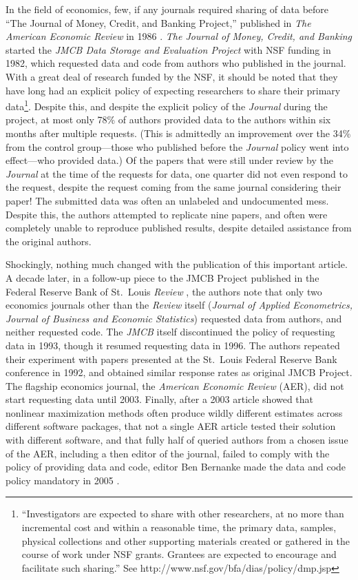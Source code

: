 \documentclass[12pt] {article}
\begin{document}
In the field of economics, few, if any journals required sharing of data
before ``The Journal of Money, Credit, and Banking Project,'' published
in \emph{The American Economic Review} in 1986 \citep{dewald_replication_1986}. \emph{The Journal of Money, Credit, and Banking} started
the \emph{JMCB Data Storage and Evaluation Project} with NSF funding in
1982, which requested data and code from authors who published in the
journal. With a great deal of research funded by the NSF, it should be
noted that they have long had an explicit policy of expecting
researchers to share their primary data\footnote{``Investigators are
  expected to share with other researchers, at no more than incremental
  cost and within a reasonable time, the primary data, samples, physical
  collections and other supporting materials created or gathered in the
  course of work under NSF grants. Grantees are expected to encourage
  and facilitate such sharing.'' See
  http://www.nsf.gov/bfa/dias/policy/dmp.jsp}. Despite this, and despite
the explicit policy of the \emph{Journal} during the project, at most
only 78\% of authors provided data to the authors within six months
after multiple requests. (This is admittedly an improvement over the
34\% from the control group---those who published before the
\emph{Journal} policy went into effect---who provided data.) Of the
papers that were still under review by the \emph{Journal} at the time of
the requests for data, one quarter did not even respond to the request,
despite the request coming from the same journal considering their
paper! The submitted data was often an unlabeled and undocumented mess.
Despite this, the authors attempted to replicate nine papers, and often
were completely unable to reproduce published results, despite detailed
assistance from the original authors.

Shockingly, nothing much changed with the publication of this important
article. A decade later, in a follow-up piece to the JMCB Project
published in the Federal Reserve Bank of St.~Louis \emph{Review}
\citep{anderson_replication_1994}, the authors note that only two economics
journals other than the \emph{Review} itself (\emph{Journal of Applied
Econometrics, Journal of Business and Economic Statistics}) requested
data from authors, and neither requested code. The \emph{JMCB} itself
discontinued the policy of requesting data in 1993, though it resumed
requesting data in 1996. The authors repeated their experiment with
papers presented at the St.~Louis Federal Reserve Bank conference in
1992, and obtained similar response rates as original JMCB Project. The
flagship economics journal, the \emph{American Economic Review} (AER),
did not start requesting data until 2003. Finally, after a 2003 article
showed that nonlinear maximization methods often produce wildly
different estimates across different software packages, that not a
single AER article tested their solution with different software, and
that fully half of queried authors from a chosen issue of the AER,
including a then editor of the journal, failed to comply with the policy
of providing data and code, editor Ben Bernanke made the data and code
policy mandatory in 2005 \citep{mccullough_verifying_2003, mccullough_got_2007}.
\end{document}

